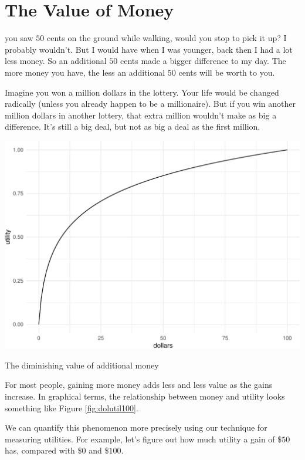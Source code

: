\documentclass[justified]{tufte-book}
\theoremstyle{definition}
\theoremstyle{definition}
\theoremstyle{definition}
\theoremstyle{remark}
\begin{document}
\hypertarget{the-value-of-money}{%
\section{The Value of Money}\label{the-value-of-money}}

 you saw \(50\) cents on the ground while walking, would you stop to pick it up? I probably wouldn't. But I would have when I was younger, back then I had a lot less money. So an additional \(50\) cents made a bigger difference to my day. The more money you have, the less an additional \(50\) cents will be worth to you.

Imagine you won a million dollars in the lottery. Your life would be changed radically (unless you already happen to be a millionaire). But if you win another million dollars in another lottery, that extra million wouldn't make as big a difference. It's still a big deal, but not as big a deal as the first million.

\begin{marginfigure}
\includegraphics{_main_files/figure-latex/dolutil100-1} \caption[The diminishing value of additional money]{The diminishing value of additional money}\label{fig:dolutil100}
\end{marginfigure}

For most people, gaining more money adds less and less value as the gains increase. In graphical terms, the relationship between money and utility looks something like Figure \ref{fig:dolutil100}.

We can quantify this phenomenon more precisely using our technique for measuring utilities. For example, let's figure out how much utility a gain of \(\$50\) has, compared with \(\$0\) and \(\$100\).
\end{document}
